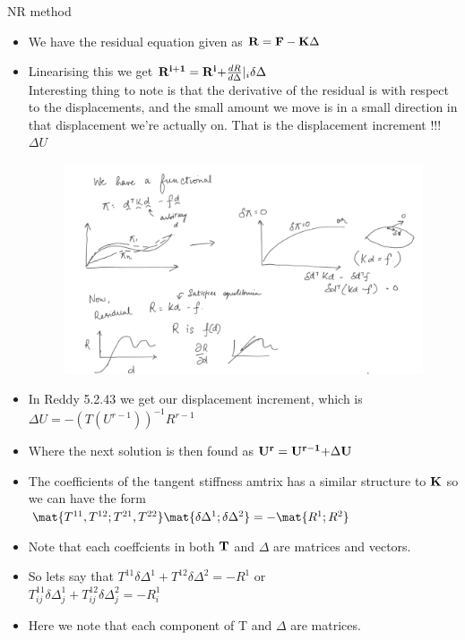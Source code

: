 	\begin{frame}{NR method}
		\begin{itemize}
			\item We have the residual equation given as 
			$\mathbf{R = F - K }\Delta$
			\item Linearising this we get $\mathbf{R^{i+1} = R^i +} \frac{d R}{d  \Delta}|_i \delta \Delta$ \\
			Interesting thing to note is that the derivative of the residual is with respect to the displacements, and the small amount we move is in a small direction in that displacement we're actually on. That is the displacement increment !!! $\Delta U$ 
			
			\begin{figure}
				\centering
				\includegraphics[width=0.7\linewidth]{Figure/1}
				\caption{}
				\label{fig:1}
			\end{figure}
		\end{itemize}
	\end{frame}


	\begin{frame}
		\begin{itemize}
			\item In Reddy 5.2.43 we get our displacement increment, which is $\Delta U = -\left( T(U^{r-1}) \right)^{-1} R^{r-1}$ 
			\item Where the next solution is then found as $\mathbf{U^{r} = U^{r-1}+ } \Delta \mathbf{U}$
			\item The coefficients of the tangent stiffness amtrix has a similar structure to $\mathbf{K}$ so we can have the form
			$\mat{T^{11},T^{12} ; T^{21},T^{22}} \mat{\delta \Delta^1 ; \delta \Delta^2} = - \mat{R^1 ; R^2}$
			\item Note that each coeffcients in both $\mathbf{T}$ and $ \Delta$ are matrices and vectors.
			\item So lets say that $T^{11} \delta \Delta^{1} + T^{12} \delta \Delta^{2} =  - R^{1}$  or  \\
			$T^{11}_{ij} \delta \Delta^{1}_j + T^{12}_{ij} \delta \Delta^{2}_j =  - R^{1}_i$
			\item Here we note that each component of T and $\Delta$ are matrices.		\end{itemize}
	\end{frame}

